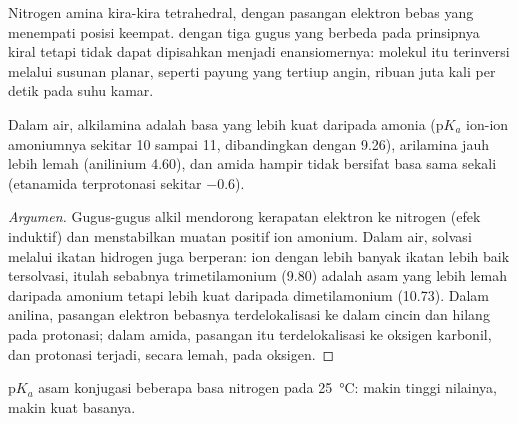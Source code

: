Nitrogen amina kira-kira tetrahedral, dengan pasangan elektron bebas yang
menempati posisi keempat.  dengan tiga gugus yang berbeda pada
prinsipnya kiral tetapi tidak dapat dipisahkan menjadi enansiomernya:
molekul itu terinversi melalui susunan planar, seperti payung yang tertiup
angin, ribuan juta kali per detik pada suhu kamar.

\begin{proposition}[Kebasaan]\label{prop:b2:amines:basicity}
Dalam air, alkilamina adalah basa yang lebih kuat daripada amonia
($\mathrm pK_a$ ion-ion amoniumnya sekitar 10 sampai 11, dibandingkan dengan 9.26), arilamina
jauh lebih lemah (anilinium 4.60), dan amida hampir tidak bersifat basa
sama sekali (etanamida terprotonasi sekitar $-0.6$).
\end{proposition}

\begin{proof}[Argumen]
Gugus-gugus alkil mendorong kerapatan elektron ke nitrogen (efek induktif)
dan menstabilkan muatan positif ion amonium. Dalam air, solvasi melalui
ikatan hidrogen juga berperan: ion dengan lebih banyak ikatan  lebih
baik tersolvasi, itulah sebabnya trimetilamonium (9.80) adalah asam yang
lebih lemah daripada amonium tetapi lebih kuat daripada dimetilamonium
(10.73). Dalam anilina, pasangan elektron bebasnya terdelokalisasi ke dalam
cincin dan hilang pada protonasi; dalam amida, pasangan itu terdelokalisasi
ke oksigen karbonil, dan protonasi terjadi, secara lemah, pada oksigen.
\end{proof}

\begin{omfigure}

{\small $\mathrm pK_a$ asam konjugasi beberapa basa nitrogen pada
\qty{25}{\degreeCelsius}: makin tinggi nilainya, makin kuat basanya.}
\end{omfigure}

